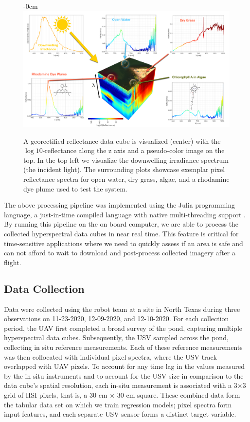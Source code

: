 \documentclass[remotesensing,article,submit,pdftex,moreauthors]{Definitions/mdpi}
\begin{document}
\begin{figure}[t!]
\begin{adjustwidth}{-\extralength}{0cm}
\centering
\vspace{-0.3in}
\includegraphics[width=15.5cm]{paper/figures/materials-and-methods/HyperSpectralInfoGraphic.pdf}
\end{adjustwidth}
\caption{A georectified reflectance data cube is visualized (center) with the $\log10$-reflectance along the z axis and a pseudo-color image on the top. In the top left we visualize the downwelling irradiance spectrum (the incident light). The surrounding plots showcase exemplar pixel reflectance spectra for open water, dry grass, algae, and a rhodamine dye plume used to test the system.\label{fig:hsi-infographic}}
\end{figure}  

The above processing pipeline was implemented using the Julia programming language, a just-in-time compiled language with native multi-threading support \cite{julia-1}. By running this pipeline on the on board computer, we are able to process the collected hyperspectral data cubes in near real time. This feature is critical for time-sensitive applications where we need to quickly assess if an area is safe and can not afford to wait to download and post-process collected imagery after a flight.

\subsection{Data Collection}

Data were collected using the robot team at a site in North Texas during three observations on 11-23-2020, 12-09-2020, and 12-10-2020. For each collection period, the UAV first completed a broad survey of the pond, capturing multiple hyperspectral data cubes. Subsequently, the USV sampled across the pond, collecting in situ reference measurements. Each of these reference measurements was then collocated with individual pixel spectra, where the USV track overlapped with UAV pixels. To account for any time lag in the values measured by the in situ instruments and to account for the USV size in comparison to the data cube's spatial resolution, each in-situ measurement is associated with a 3$\times$3 grid of HSI pixels, that is, a 30 cm $\times$ 30 cm square. These combined data form the tabular data set on which we train regression models; pixel spectra form input features, and each separate USV sensor forms a distinct target variable. 
\end{document}
